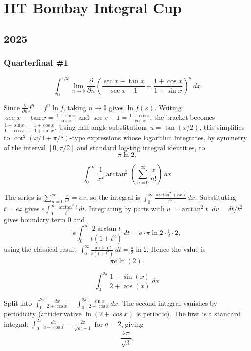\section{IIT Bombay Integral Cup}
\subsection*{2025}

\subsubsection*{Quarterfinal \#1}
\begin{questions}

\question
\[
\int_0^{\pi/2} \lim_{n\to 0}\frac{\partial}{\partial n}\left(\frac{\sec x-\tan x}{\sec x-1}+\frac{1+\cos x}{1+\sin x}\right)^n \, dx
\]
\begin{solution}
Since $\frac{\partial}{\partial n}f^n = f^n\ln f$, taking $n\to0$ gives $\ln f(x)$. Writing
$\sec x-\tan x=\frac{1-\sin x}{\cos x}$ and $\sec x - 1=\frac{1-\cos x}{\cos x}$, the bracket becomes
$\frac{1-\sin x}{1-\cos x}+\frac{1+\cos x}{1+\sin x}$. Using half-angle substitutions $u=\tan(x/2)$, this simplifies to $\cot^2(x/4+\pi/8)$-type expressions whose logarithm integrates, by symmetry of the interval $[0,\pi/2]$ and standard log-trig integral identities, to
\[
\pi\ln 2.
\]
\end{solution}

\question
\[
\int_0^{\infty} \frac{1}{x^2}\arctan^2\!\left(\sum_{n=0}^{\infty}\frac{x}{n!}\right) \, dx
\]
\begin{solution}
The series is $\displaystyle\sum_{n=0}^\infty \frac{x}{n!}=ex$, so the integral is $\int_0^\infty \frac{\arctan^2(ex)}{x^2}\,dx$. Substituting $t=ex$ gives $e\int_0^\infty \frac{\arctan^2 t}{t^2}\,dt$. Integrating by parts with $u=\arctan^2 t$, $dv=dt/t^2$ gives boundary term $0$ and
\[
e\int_0^\infty \frac{2\arctan t}{t(1+t^2)}\,dt = e\cdot\pi\ln 2 \cdot\tfrac12\cdot 2,
\]
using the classical result $\int_0^\infty\frac{\arctan t}{t(1+t^2)}\,dt=\tfrac{\pi}{2}\ln2$. Hence the value is
\[
\pi e\ln(2).
\]
\end{solution}

\question
\[
\int_0^{2\pi} \frac{1-\sin(x)}{2+\cos(x)} \, dx
\]
\begin{solution}
Split into $\int_0^{2\pi}\frac{dx}{2+\cos x} - \int_0^{2\pi}\frac{\sin x}{2+\cos x}\,dx$. The second integral vanishes by periodicity (antiderivative $\ln(2+\cos x)$ is periodic). The first is a standard integral: $\int_0^{2\pi}\frac{dx}{a+\cos x}=\frac{2\pi}{\sqrt{a^2-1}}$ for $a=2$, giving
\[
\frac{2\pi}{\sqrt{3}}.
\]
\end{solution}

\end{questions}

